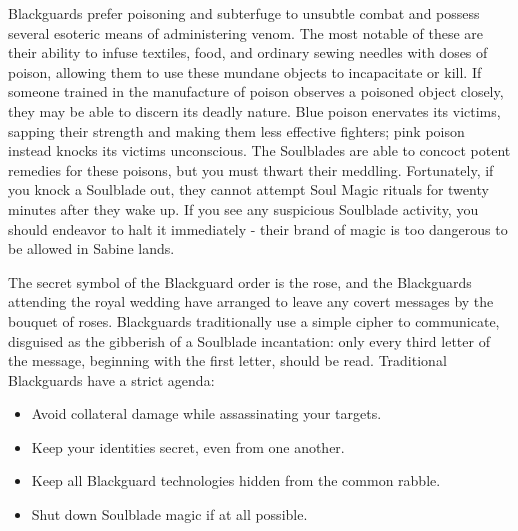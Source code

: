 \documentclass[blue]{Kos}
\begin{document}
Blackguards prefer poisoning and subterfuge to unsubtle combat and possess several esoteric means of administering venom. The most notable of these are their ability to infuse textiles, food, and ordinary sewing needles with doses of poison, allowing them to use these mundane objects to incapacitate or kill. If someone trained in the manufacture of poison observes a poisoned object closely, they may be able to discern its deadly nature. Blue poison enervates its victims, sapping their strength and making them less effective fighters; pink poison instead knocks its victims unconscious. The Soulblades are able to concoct potent remedies for these poisons, but you must thwart their meddling. Fortunately, if you knock a Soulblade out, they cannot attempt Soul Magic rituals for twenty minutes after they wake up. If you see any suspicious Soulblade activity, you should endeavor to halt it immediately - their brand of magic is too dangerous to be allowed in Sabine lands.

The secret symbol of the Blackguard order is the rose, and the Blackguards attending the royal wedding have arranged to leave any covert messages by the bouquet of roses. Blackguards traditionally use a simple cipher to communicate, disguised as the gibberish of a Soulblade incantation: only every third letter of the message, beginning with the first letter, should be read.  Traditional Blackguards have a strict agenda: 

\begin{itemize}
\item Avoid collateral damage while assassinating your targets.
\item Keep your identities secret, even from one another.
\item Keep all Blackguard technologies hidden from the common rabble.
\item Shut down Soulblade magic if at all possible.
\end{itemize}
\end{document}
